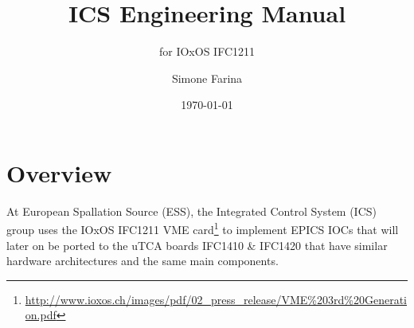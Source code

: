 \documentclass[11pt
  , a4paper
  , article
  , oneside
  , showtrims
]{memoir}
\begin{document}


\date{\today}




\title{ICS Engineering Manual}
\subtitle{for IOxOS IFC1211}
\author{Simone Farina }



\showtrimson

\esstitle
\newpage
\tableofcontents
\newpage



\chapter{Overview}
At European Spallation Source (ESS), the Integrated Control System (ICS) group uses the IOxOS IFC1211 VME card{\footnote{\url{http://www.ioxos.ch/images/pdf/02_press_release/VME\%203rd\%20Generation.pdf}}} to implement EPICS IOCs that will later on be ported to the uTCA boards IFC1410 \& IFC1420 that have similar hardware architectures and the same main components.
\end{document}
